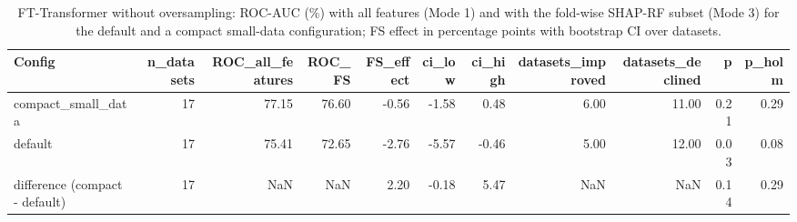 \begin{table}
\caption{FT-Transformer without oversampling: ROC-AUC (\%) with all features (Mode 1) and with the fold-wise SHAP-RF subset (Mode 3) for the default and a compact small-data configuration; FS effect in percentage points with bootstrap CI over datasets.}
\label{tab:r32_ft_fs}
\begin{tabular}{lrrrrrrrrrr}
\toprule
Config & n\_datasets & ROC\_all\_features & ROC\_FS & FS\_effect & ci\_low & ci\_high & datasets\_improved & datasets\_declined & p & p\_holm \\
\midrule
compact\_small\_data & 17 & 77.15 & 76.60 & -0.56 & -1.58 & 0.48 & 6.00 & 11.00 & 0.21 & 0.29 \\
default & 17 & 75.41 & 72.65 & -2.76 & -5.57 & -0.46 & 5.00 & 12.00 & 0.03 & 0.08 \\
difference (compact - default) & 17 & NaN & NaN & 2.20 & -0.18 & 5.47 & NaN & NaN & 0.14 & 0.29 \\
\bottomrule
\end{tabular}
\end{table}
